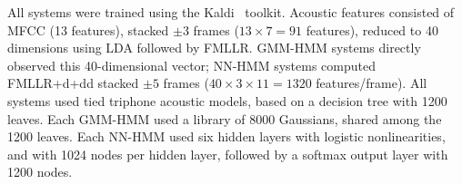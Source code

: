 {\color{blue} All systems were trained using the
  Kaldi~\cite{Kaldi2011} toolkit.  Acoustic features consisted of MFCC
  (13 features), stacked $\pm 3$ frames ($13\times 7=91$ features),
  reduced to 40 dimensions using LDA followed by FMLLR.  GMM-HMM
  systems directly observed this 40-dimensional vector; NN-HMM systems
  computed FMLLR+d+dd stacked $\pm 5$ frames ($40\times 3\times
  11=1320$ features/frame).  All systems used tied triphone acoustic
  models, based on a decision tree with 1200 leaves.  Each GMM-HMM
  used a library of 8000 Gaussians, shared among the 1200 leaves.
  Each NN-HMM used six hidden layers with logistic nonlinearities, and
  with 1024 nodes per hidden layer, followed by a softmax output layer
  with 1200 nodes.}
  




